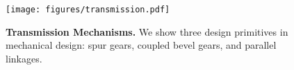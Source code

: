 \begin{figure}
  \centering
  \texttt{[image: figures/transmission.pdf]}
  \caption{\textbf{Transmission Mechanisms.} We show three design primitives in \systems mechanical design: spur gears, coupled bevel gears, and parallel linkages.}
  \label{fig:transmission}
  \vspace{-1mm}
\end{figure}



